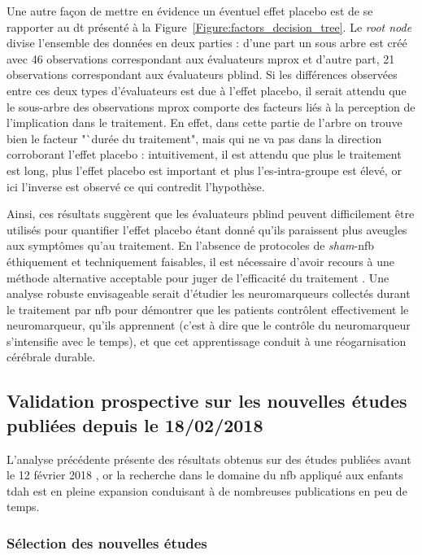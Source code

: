 Une autre façon de mettre en évidence un éventuel effet placebo est de se rapporter au \gls{dt} présenté à la Figure~\ref{Figure:factors_decision_tree}. Le 
\textit{root node} divise l'ensemble des données en deux parties : d'une part un sous arbre est créé avec 46 observations correspondant aux évaluateurs
\gls{mprox} et d'autre part, 21 observations correspondant aux évaluateurs \gls{pblind}. Si les différences observées entre ces deux types d'évaluateurs est due à l'effet
placebo, il serait attendu que le sous-arbre des observations \gls{mprox} comporte des facteurs liés à la perception de l'implication dans le traitement. En effet, dans cette
partie de l'arbre on trouve bien le facteur "`durée du traitement", mais qui ne va pas dans la direction corroborant l'effet placebo : intuitivement, 
il est attendu que plus le traitement est long, plus l'effet placebo est important et plus l'\gls{es}-intra-groupe est élevé, or ici l'inverse est observé ce qui
contredit l'hypothèse. 

Ainsi, ces résultats suggèrent que les évaluateurs \gls{pblind} peuvent difficilement être utilisés pour quantifier l'effet placebo étant donné qu'ils paraissent
plus aveugles aux symptômes qu'au traitement. En l'absence de protocoles de \textit{sham}-\gls{nfb} éthiquement \citep{Holtmann2014} et techniquement \citep{Birbaumer1991} 
faisables, il est nécessaire d'avoir recours à une méthode alternative acceptable pour juger de l'efficacité du traitement \citep{World-Medical-Association2000}. Une analyse robuste envisageable 
serait d'étudier les neuromarqueurs collectés durant le traitement par \gls{nfb} pour démontrer que les patients contrôlent effectivement le neuromarqueur, qu'ils 
apprennent (c'est à dire que le contrôle du neuromarqueur s'intensifie avec le temps), et que cet apprentissage conduit à une réogarnisation cérébrale durable. 

\subsection{Validation prospective sur les nouvelles études publiées depuis le 18/02/2018}

L'analyse précédente présente des résultats obtenus sur des études publiées avant le 12 février 2018 \citep{Bussalb2019a}, or la recherche dans le domaine du \gls{nfb} appliqué aux enfants \gls{tdah} est
en pleine expansion conduisant à de nombreuses publications en peu de temps.

\subsubsection{Sélection des nouvelles études} 

